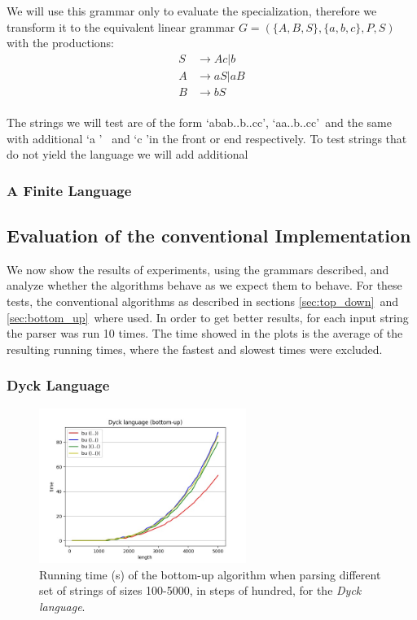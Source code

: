 We will use this grammar only to evaluate the specialization, therefore we transform it to the equivalent linear grammar $G=(\{A,B,S\}, \{a,b,c\}, P, S)$ with the productions:
\begin{align*}
    S&\rightarrow Ac|b\\
    A&\rightarrow aS|aB\\
    B&\rightarrow bS\\
\end{align*}

The strings we will test are of the form \lq abab..b..cc\rq, \lq aa..b..cc\rq~and the same with additional \lq a \rq~ and \lq c \rq in the front or end respectively.
To test strings that do not yield the language we will add additional 


\subsubsection{A Finite Language}

\subsection{Evaluation of the conventional Implementation}
We now show the results of experiments, using the grammars described, and analyze whether the algorithms behave as we expect them to behave.
For these tests, the conventional algorithms as described in sections \ref{sec:top_down}~and \ref{sec:bottom_up}~where used.
In order to get better results, for each input string the parser was run 10 times.
The time showed in the plots is the average of the resulting running times, where the fastest and slowest times were excluded.

\subsubsection{Dyck Language}

\begin{figure}[!ht]
    \centering
    \includegraphics[width=0.6\textwidth]{Resources/t_dyck_bu.jpg}
    \caption{Running time (s) of the bottom-up algorithm when parsing different set of strings of sizes 100-5000, in steps of hundred, for the \textit{Dyck language}.}
    \label{fig:t_dyck_bu}
\end{figure}

